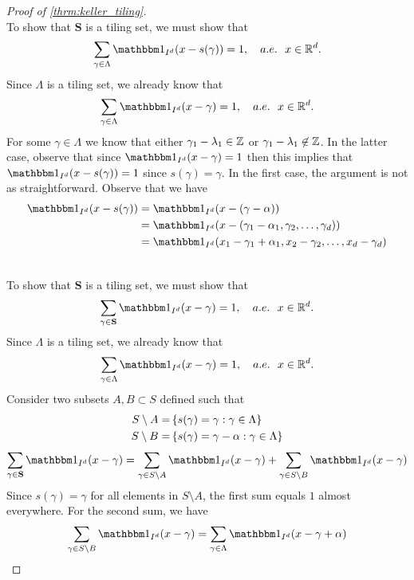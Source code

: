 \documentclass[../thesis.tex]{subfiles}
\begin{document}
\begin{proof}[Proof of \cref{thrm:keller_tiling}]
    \\
    To show that $\mathbf{S}$ is a tiling set, we must show that
    \begin{equation*}
        \sum_{\gamma \in \Lambda} \indicator{I^d}{x-s(\gamma)} = 1, \quad a.e. \text{\space\space} x \in \R^d.
    \end{equation*}
    Since $\Lambda$ is a tiling set, we already know that
    \begin{equation*}
        \sum_{\gamma \in \Lambda} \indicator{I^d}{x-\gamma} = 1, \quad a.e. \text{\space\space} x \in \R^d.
    \end{equation*}
    For some $\gamma\in \Lambda$ we know that either $\gamma_1-\lambda_1 \in \mathbb{Z}$ or $\gamma_1-\lambda_1 \not\in \mathbb{Z}$. In the latter case, observe that since
    $\indicator{I^d}{x-\gamma} = 1$ then this implies that $\indicator{I^d}{x-s(\gamma)} = 1$ since $s(\gamma) = \gamma$. In the first case, the argument is not as straightforward. Observe that we have
    \begin{align*}
        \indicator{I^d}{x-s(\gamma)} &= \indicator{I^d}{x- (\gamma-\alpha)}\\
        &= \indicator{I^d}{x- (\gamma_1-\alpha_1,\gamma_2,\dots,\gamma_d)}\\
        &= \indicator{I^d}{x_1-\gamma_1+\alpha_1,x_2- \gamma_2,\dots,x_d-\gamma_d}\\
    \end{align*}


    \\
    To show that $\mathbf{S}$ is a tiling set, we must show that
    \begin{equation*}
        \sum_{\gamma \in \mathbf{S}} \indicator{I^d}{x-\gamma} = 1, \quad a.e. \text{\space\space} x \in \R^d.
    \end{equation*}
    Since $\Lambda$ is a tiling set, we already know that
    \begin{equation*}
        \sum_{\gamma \in \Lambda} \indicator{I^d}{x-\gamma} = 1, \quad a.e. \text{\space\space} x \in \R^d.
    \end{equation*}
    Consider two subsets $A, B \subset S$ defined such that 
    \begin{align*}
        S\setminus A =& \left\{s(\gamma) = \gamma : \gamma \in \Lambda\right\}\\
        S\setminus B =& \left\{s(\gamma) = \gamma - \alpha : \gamma \in \Lambda\right\}
    \end{align*}
    \begin{align*}
        \sum_{\gamma \in \mathbf{S}} \indicator{I^d}{x-\gamma} = \sum_{\gamma \in S\setminus A} \indicator{I^d}{x-\gamma} +\sum_{\gamma \in S\setminus B} \indicator{I^d}{x-\gamma}
    \end{align*}
    Since $s(\gamma) = \gamma$ for all elements in $S\setminus A$, the first sum equals $1$ almost everywhere. For the second sum, we have
    \begin{align*}
        \sum_{\gamma \in S\setminus B} \indicator{I^d}{x-\gamma} = \sum_{\gamma \in \Lambda} \indicator{I^d}{x-\gamma + \alpha}
    \end{align*}


\end{proof}
\end{document}
